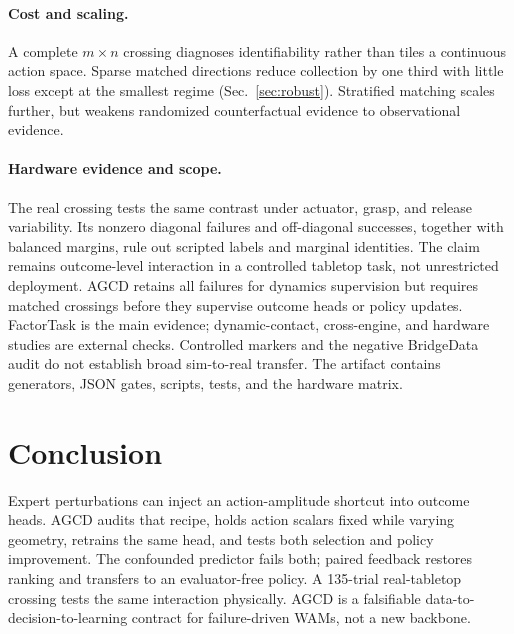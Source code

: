\documentclass[conference]{IEEEtran}
\begin{document}
\paragraph{Cost and scaling.}
A complete $m\!\times\!n$ crossing diagnoses identifiability rather than tiles a
continuous action space. Sparse matched directions reduce collection by one
third with little loss except at the smallest regime (Sec.~\ref{sec:robust}).
Stratified matching scales further, but weakens randomized counterfactual
evidence to observational evidence.

\paragraph{Hardware evidence and scope.}
The real crossing tests the same contrast under actuator, grasp, and release
variability. Its nonzero diagonal failures and off-diagonal successes, together
with balanced margins, rule out scripted labels and marginal identities. The
claim remains outcome-level interaction in a controlled tabletop task, not
unrestricted deployment. AGCD retains all failures for dynamics supervision but
requires matched crossings before they supervise outcome heads or policy
updates. FactorTask is the main evidence; dynamic-contact, cross-engine, and
hardware studies are external checks. Controlled markers and the negative
BridgeData audit do not establish broad sim-to-real transfer. The artifact
contains generators, JSON gates, scripts, tests, and the hardware matrix.

\section{Conclusion}
\label{sec:conclusion}

Expert perturbations can inject an action-amplitude shortcut into outcome heads.
AGCD audits that recipe, holds action scalars fixed while varying geometry,
retrains the same head, and tests both selection and policy improvement. The
confounded predictor fails both; paired feedback restores ranking and transfers
to an evaluator-free policy. A 135-trial real-tabletop crossing tests the same
interaction physically. AGCD is a falsifiable data-to-decision-to-learning
contract for failure-driven WAMs, not a new backbone.
\end{document}
